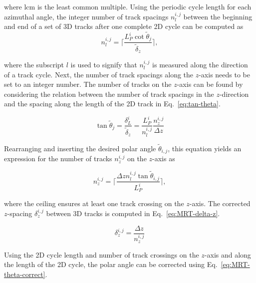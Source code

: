 \noindent
where lcm is the least common multiple. Using the periodic cycle length for each azimuthal angle, the integer number of track spacings $n_l^{i,j}$ between the beginning and end of a set of 3D tracks after one complete 2D cycle can be computed as
\begin{equation}
n_l^{i,j} = \Bigg\lceil \frac{L_P^i \cot{\tilde{\theta}_{j}}}{\tilde{\delta}_z} \Bigg\rceil,
\label{eq:MRT-nl}
\end{equation}

\noindent
where the subscript $l$ is used to signify that $n_l^{i,j}$ is measured along the direction of a track cycle. Next, the number of track spacings along the $z$-axis needs to be set to an integer number. The number of tracks on the $z$-axis can be found by considering the relation between the number of track spacings in the $z$-direction and the spacing along the length of the 2D track in Eq.~\ref{eq:tan-theta}.

\begin{equation}
\tan{\tilde{\theta}_{j}} = \frac{\delta_L^i}{\tilde{\delta}_z} = \frac{L_P^i}{n_l^{i,j}} \frac{n_z^{i,j}}{\Delta z}
\label{eq:tan-theta}
\end{equation}

\noindent
Rearranging and inserting the desired polar angle $\tilde{\theta}_{i,j}$, this equation yields an expression for the number of tracks $n_z^{i,j}$ on the $z$-axis as

\begin{equation}
n_z^{i,j} = \Bigg\lceil\frac{\Delta z n_l^{i,j} \tan{\tilde{\theta}_{i,j}}}{L_P^i} \Bigg\rceil,
\label{eq:MRT-nz}
\end{equation}

\noindent
where the ceiling ensures at least one track crossing on the $z$-axis. The corrected $z$-spacing $\delta_z^{i,j}$ between 3D tracks is computed in Eq.~\ref{eq:MRT-delta-z}.

\begin{equation}
\delta_z^{i,j} = \frac{\Delta z}{n_z^{i,j}}
\label{eq:MRT-delta-z}
\end{equation}

\noindent
Using the 2D cycle length and number of track crossings on the $z$-axis and along the length of the 2D cycle, the polar angle can be corrected using Eq.~\ref{eq:MRT-theta-correct}.

